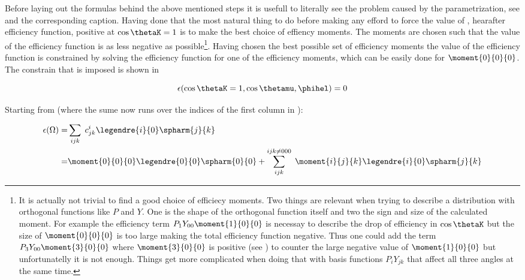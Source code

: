 Before laying out the formulas behind the above mentioned steps it is usefull to literally see the problem caused by the parametrization, see 
and the corresponding caption. Having done that the most natural thing to do before making any efford to force the value of , hearafter efficiency function,
positive at $\cos\thetaK=1$ is to make the best choice of effiency moments. The moments are chosen such that the value of the efficiency function is as less negative
as 
possible\footnote{It is actually not trivial to find a good choice of efficiecy moments. Two things are relevant when trying to describe a 
distribution with orthogonal functions like $P$ and $Y$. One is the shape of the orthogonal function itself and two the sign and size of the calculated moment.
For example the efficiency term $P_1Y_{00}\moment{1}{0}{0}$ is necessay to describe the drop of efficiency in $\cos\thetaK$ but the size of $\moment{0}{0}{0}$ 
is too large making the total efficiency function negative. Thus one could add the term $P_3Y_{00}\moment{3}{0}{0}$ where $\moment{3}{0}{0}$ is positive
(see  ) to counter the large negative value of $\moment{1}{0}{0}$ but unfortunatelly it is not enough. Things get more complicated
when doing that with basis functions $P_iY_{jk}$ that affect all three angles at the same time.
}.
Having chosen the best possible set of efficiency moments the value of the efficiency function is constrained by solving the efficiency function for
one of the efficiency moments, which can be easily done for $\moment{0}{0}{0}$. The constrain that is imposed is shown in 

\begin{center}
\begin{equation}
  \epsilon(\cos\thetaK = 1, \cos\thetamu, \phihel) = 0 
  \label{eff_func_constr}
\end{equation}
\end{center}

\noindent Starting from  (where the sume now runs over the indices of the first column in ):

\begin{center}
\begin{align}
  \epsilon(\Omega) =& \sum_{ijk} \; c^i_{jk} \legendre{i}{0} \spharm{j}{k} \nonumber \\
                   =& \moment{0}{0}{0} \legendre{0}{0} \spharm{0}{0} + \sum_{ijk}^{ijk\neq 000} \; \moment{i}{j}{k} \legendre{i}{0} \spharm{j}{k}
  \label{eff_func_rewriten}
\end{align}
\end{center}


